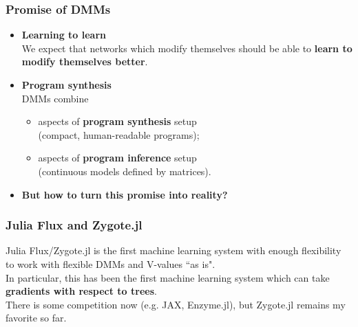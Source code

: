 \documentclass{beamer}
\newcommand{\msmagenta}[1]{{\color{mymagenta} #1}}
\begin{document}
\begin{frame}

  \frametitle{Promise of DMMs}

\begin{itemize} 

\item \msmagenta{{\bf Learning to learn}}\\[2ex]

We expect that networks which modify themselves should be able to {\bf learn to modify themselves better}.\\[2ex]

\item \msmagenta{{\bf Program synthesis}}\\[2ex]

DMMs combine\\

\begin{itemize}

\item aspects of {\bf program synthesis} setup\\ (compact, human-readable programs);\\

\item aspects of {\bf program inference} setup\\ (continuous models defined by matrices).\\[2ex]

\end{itemize} 

\item \msmagenta{{\bf But how to turn this promise into reality?}}
\end{itemize}

\end{frame}

\begin{frame}

  \frametitle{Julia Flux and Zygote.jl}

Julia Flux/Zygote.jl is the first machine learning system with enough flexibility to
work with flexible DMMs and V-values ``as is".\\[4ex]

In particular, this has been the first machine learning system which can take 
{\bf gradients with respect to trees}.\\[4ex]

There is some competition now (e.g. JAX, Enzyme.jl), but Zygote.jl remains my favorite so far.

\end{frame}
\end{document}
